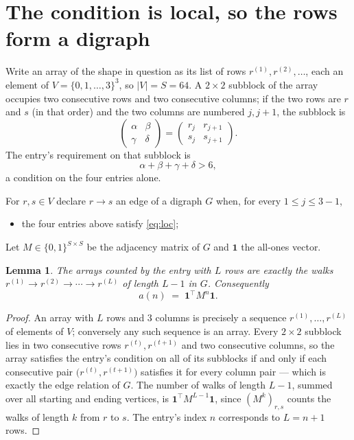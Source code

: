 \documentclass[11pt,a4paper]{article}
\theoremstyle{plain}
\newtheorem{lemma}[theorem]{Lemma}
\theoremstyle{definition}
\begin{document}
\section{The condition is local, so the rows form a digraph}

Write an array of the shape in question as its list of rows
$r^{(1)},r^{(2)},\dots$, each an element of
$V=\{0,1,\dots,3\}^{3}$, so $|V|=S=64$. A $2\times2$ subblock of the array
occupies two consecutive rows and two consecutive columns; if the two rows are $r$
and $s$ (in that order) and the two columns are numbered $j,j+1$,
the subblock is
\[
\begin{pmatrix}\alpha&\beta\\\gamma&\delta\end{pmatrix}=\begin{pmatrix}r_j&r_{j+1}\\s_j&s_{j+1}\end{pmatrix}.
\]
The entry's requirement on that subblock is
\begin{equation}\label{eq:loc}
\alpha+\beta+\gamma+\delta>6,
\end{equation}
a condition on the four entries alone.

For $r,s\in V$ declare $r\to s$ an edge of a digraph $G$ when, for every
$1\le j\le 3-1$,
\begin{itemize}
\item the four entries above satisfy \eqref{eq:loc};

\end{itemize}
Let $M\in\{0,1\}^{S\times S}$ be the adjacency matrix of $G$ and $\mathbf{1}$ the
all-ones vector.

\begin{lemma}\label{lem:walk}
The arrays counted by the entry with $L$ rows are exactly the walks
$r^{(1)}\to r^{(2)}\to\cdots\to r^{(L)}$ of length $L-1$ in $G$. Consequently
\[
a(n)\;=\;\mathbf{1}^{\!\top}M^{n}\mathbf{1} .
\]
\end{lemma}

\begin{proof}
An array with $L$ rows and $3$ columns is precisely a sequence
$r^{(1)},\dots,r^{(L)}$ of elements of $V$; conversely any such sequence is an array.
Every $2\times2$ subblock lies in two consecutive rows $r^{(t)},r^{(t+1)}$ and two
consecutive columns, so the array satisfies the entry's condition on all of its subblocks
if and only if each consecutive pair $\bigl(r^{(t)},r^{(t+1)}\bigr)$ satisfies it for
every column pair --- which is exactly the edge relation of $G$. The number of walks of
length $L-1$, summed over all starting and ending vertices, is
$\mathbf{1}^{\!\top}M^{L-1}\mathbf{1}$, since $(M^{k})_{r,s}$ counts the walks of
length $k$ from $r$ to $s$. The entry's index $n$ corresponds to $L=n+1$ rows.
\end{proof}
\end{document}
